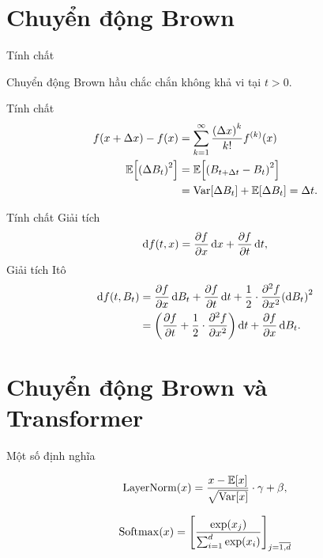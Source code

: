 \documentclass[aspectratio=169,mathserif]{beamer}
\newcommand{\citef}[1]{\cite{#1}\ffcite{#1}}
\begin{document}
\section{Chuyển động Brown}
\begin{frame}{Tính chất}
    \begin{prop}\label{prop:nowhere-diff-brown}
    Chuyển động Brown hầu chắc chắn không khả vi
    tại $t>0$\citef{S096:17}.
    \end{prop}
\end{frame}


\begin{frame}{Tính chất}
\begin{align}
f\left(x+\Delta x\right)-f\left(x\right)&=\sum_{k=1}^{\infty}\frac{\left(\Delta x\right)^{k}}{k!}f^{\left(k\right)}\left(x\right)\\
\Ex\left[\left(\Delta B_{t}\right)^{2}\right] & =\Ex\left[\left(B_{t+\Delta t}-B_{t}\right)^{2}\right]\\
 & =\Var\left[\Delta B_{t}\right]+\Ex\left[\Delta B_{t}\right]=\Delta t.
\end{align}
\end{frame}

\begin{frame}{Tính chất}
Giải tích
\begin{align}
    \D f\left(t,x\right)=\frac{\partial f}{\partial x}\D x+\frac{\partial f}{\partial t}\D t,
\end{align}
Giải tích Itô
\begin{align}
    \D f\left(t,B_{t}\right) & =\frac{\partial f}{\partial x}\D B_{t}+\frac{\partial f}{\partial t}\D t+\frac{1}{2}\cdot\frac{\partial^{2}f}{\partial x^{2}}\left(\D B_{t}\right)^{2} \nonumber\\
     & =\left(\frac{\partial f}{\partial t}+\frac{1}{2}\cdot\frac{\partial^{2}f}{\partial x^{2}}\right)\D t+\frac{\partial f}{\partial x}\D B_{t}.\label{eq:ito-diff}
\end{align}
\end{frame}

\section{Chuyển động Brown và Transformer}

\begin{frame}{Một số định nghĩa}
\begin{defn}
\begin{equation}
\LayerNorm\left(x\right)=\frac{x-\Ex\left[x\right]}{\sqrt{\Var\left[x\right]}}\cdot\gamma+\beta,    
\end{equation}
\end{defn}

\begin{defn}[Softmax]
\begin{equation}
\Softmax\left(x\right)=\left[\frac{\exp\left(x_{j}\right)}{\sum_{i=1}^{d}\exp\left(x_{i}\right)}\right]_{j=\overline{1,d}}
\end{equation}
\end{defn}
\end{frame}
\end{document}
